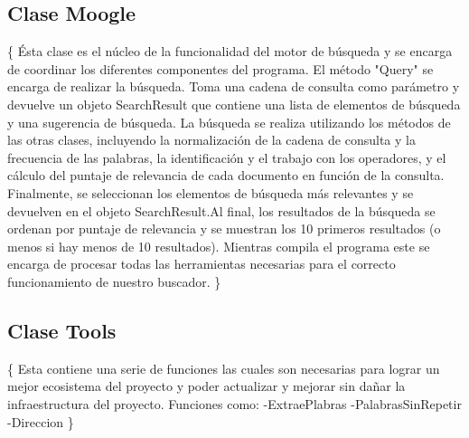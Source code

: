 \documentclass[12]{article}
\begin{document}
\subsection{Clase Moogle}
\{
Ésta clase es el núcleo de la funcionalidad del motor de búsqueda y se encarga de coordinar los 
diferentes componentes del programa. El método "Query" se encarga de realizar la búsqueda. 
Toma una cadena de consulta como parámetro y devuelve un objeto SearchResult que 
contiene una lista de elementos de búsqueda y una sugerencia de búsqueda. La búsqueda se 
realiza utilizando los métodos de las otras clases, incluyendo la normalización de la cadena de 
consulta y la frecuencia de las palabras, la identificación y el trabajo con los operadores, y el 
cálculo del puntaje de relevancia de cada documento en función de la consulta. Finalmente, se 
seleccionan los elementos de búsqueda más relevantes y se devuelven en el objeto 
SearchResult.Al final, los resultados de la búsqueda se ordenan por puntaje de relevancia y se 
muestran los 10 primeros resultados (o menos si hay menos de 10 resultados). Mientras 
compila el programa este se encarga de procesar todas las herramientas necesarias para el 
correcto funcionamiento de nuestro buscador.
\}
\subsection{Clase Tools}
\{
Esta contiene una serie de funciones las cuales son necesarias para lograr un mejor ecosistema 
del proyecto y poder actualizar y mejorar sin dañar la infraestructura del proyecto.
Funciones como:
-ExtraePlabras
-PalabrasSinRepetir
-Direccion 
\}

\newpage
\end{document}

